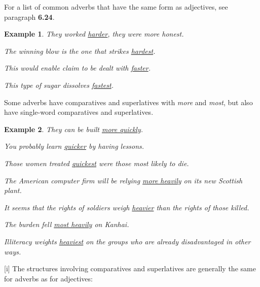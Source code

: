 \documentclass[oneside]{book}
\numberwithin{equation}{section}
\newtheorem{example}{Example}[section]
\begin{document}
For a list of common adverbs that have the same form as adjectives, see paragraph \textbf{6.24}.
\begin{example}
    They worked \underline{harder}, they were more honest.
    
    The winning blow is the one that strikes \underline{hardest}.
    
    This would enable claim to be dealt with \underline{faster}.
    
    This type of sugar dissolves \underline{fastest}.
\end{example}
%
\noindent{} Some adverbs have comparatives and superlatives with \textit{more} and \textit{most}, but also have single-word comparatives and superlatives.
\begin{example}
    They can be built \underline{more quickly}.
    
    You probably learn \underline{quicker} by having lessons.
    
    Those women treated \underline{quickest} were those most likely to die.
    
    The American computer firm will be relying \underline{more heavily} on its new Scottish plant.
    
    It seems that the rights of soldiers weigh \underline{heavier} than the rights of those killed.
    
    The burden fell \underline{most heavily} on Kanhai.
    
    Illiteracy weights \underline{heaviest} on the groups who are already disadvantaged in other ways.
\end{example}
%
\noindent{} [i] The structures involving comparatives and superlatives are generally the same for adverbs as for adjectives:
\end{document}
